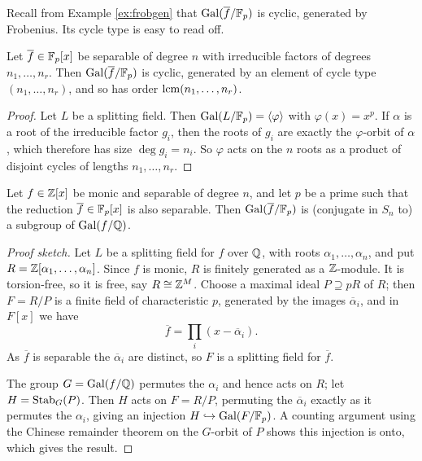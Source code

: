 \documentclass[a4paper]{scrartcl}
\newcommand{\Gal}{\operatorname{Gal}}
\begin{document}
Recall from Example \ref{ex:frobgen} that $\Gal(\overline f/\F_p)$ is cyclic, generated by Frobenius. Its cycle type is easy to read off.

\begin{proposition}\label{prop:fpcycle}
	Let $\overline f \in \mathbb{F}_p[x]$ be separable of degree $n$ with irreducible factors of degrees $n_1, \dots, n_r$. Then $\Gal(\overline f/\F_p)$ is cyclic, generated by an element of cycle type $(n_1,\dots,n_r)$, and so has order $\operatorname{lcm}(n_1,\dots,n_r)$.
\end{proposition}

\begin{proof}
	Let $L$ be a splitting field. Then $\Gal(L/\F_p) = \langle\varphi\rangle$ with $\varphi(x) = x^p$. If $\alpha$ is a root of the irreducible factor $g_i$, then the roots of $g_i$ are exactly the $\varphi$-orbit of $\alpha$, which therefore has size $\deg g_i = n_i$. So $\varphi$ acts on the $n$ roots as a product of disjoint cycles of lengths $n_1,\dots,n_r$.
\end{proof}

\begin{theorem}[Dedekind]\label{thm:dedekind}
	Let $f \in \mathbb{Z}[x]$ be monic and separable of degree $n$, and let $p$ be a prime such that the reduction $\overline f \in \mathbb{F}_p[x]$ is also separable. Then $\Gal(\overline f/\F_p)$ is (conjugate in $S_n$ to) a subgroup of $\Gal(f/\Q)$.
\end{theorem}

\begin{proof}[Proof sketch]
	Let $L$ be a splitting field for $f$ over $\mathbb{Q}$, with roots $\alpha_1,\dots,\alpha_n$, and put $R = \mathbb{Z}[\alpha_1,\dots,\alpha_n]$. Since $f$ is monic, $R$ is finitely generated as a $\mathbb{Z}$-module. It is torsion-free, so it is free, say $R \cong \mathbb{Z}^M$. Choose a maximal ideal $P \supseteq pR$ of $R$; then $F = R/P$ is a finite field of characteristic $p$, generated by the images $\overline\alpha_i$, and in $F[x]$ we have
	$$\overline f = \prod_i (x - \overline\alpha_i).$$ As $\overline f$ is separable the $\overline\alpha_i$ are distinct, so $F$ is a splitting field for $\overline f$.

	The group $G = \Gal(f/\Q)$ permutes the $\alpha_i$ and hence acts on $R$; let $H = \operatorname{Stab}_G(P)$. Then $H$ acts on $F = R/P$, permuting the $\overline\alpha_i$ exactly as it permutes the $\alpha_i$, giving an injection $H \hookrightarrow \Gal(F/\F_p)$. A counting argument using the Chinese remainder theorem on the $G$-orbit of $P$ shows this injection is onto, which gives the result.
\end{proof}
\end{document}
